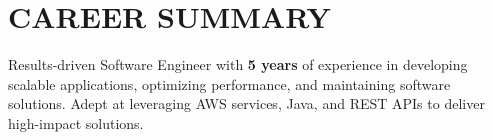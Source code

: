 \section{CAREER SUMMARY}
\begin{onecolentry}
    Results-driven Software Engineer with \textbf{5 years} of experience in developing scalable applications, optimizing performance, and maintaining software solutions. Adept at leveraging AWS services, Java, and REST APIs to deliver high-impact solutions.
\end{onecolentry}
